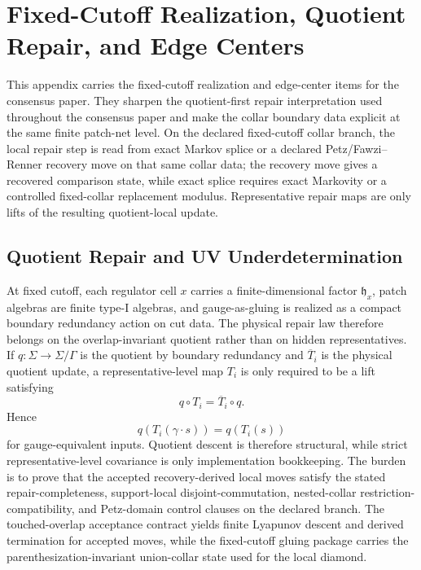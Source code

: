 \section{Fixed-Cutoff Realization, Quotient Repair, and Edge Centers}
\label{app:consensus-fixed-cutoff-port}

This appendix carries the fixed-cutoff realization and edge-center items for the consensus paper.
They sharpen the
quotient-first repair interpretation used throughout the consensus paper and make the collar
boundary data explicit at the same finite patch-net level. On the declared fixed-cutoff collar
branch, the local repair step is read from exact Markov splice or a declared Petz/Fawzi--Renner
recovery move on that same collar data; the recovery move gives a recovered comparison state, while
exact splice requires exact Markovity or a controlled fixed-collar replacement modulus. Representative
repair maps are only lifts of the resulting quotient-local update.

\subsection{Quotient Repair and UV Underdetermination}

At fixed cutoff, each regulator cell \(x\) carries a finite-dimensional factor
\(\mathfrak h_x\), patch algebras are finite type-I algebras, and gauge-as-gluing is realized as
a compact boundary redundancy action on cut data. The physical repair law therefore belongs on the
overlap-invariant quotient rather than on hidden representatives. If \(q:\Sigma\to\Sigma/\Gamma\)
is the quotient by boundary redundancy and \(\overline T_i\) is the physical quotient update, a
representative-level map \(T_i\) is only required to be a lift satisfying
\[
q\circ T_i=\overline T_i\circ q.
\]
Hence
\[
q(T_i(\gamma\cdot s))=q(T_i(s))
\]
for gauge-equivalent inputs. Quotient descent is therefore structural, while strict
representative-level covariance is only implementation bookkeeping. The burden is to prove that
the accepted recovery-derived local moves satisfy the stated repair-completeness, support-local
disjoint-commutation, nested-collar
restriction-compatibility, and Petz-domain control clauses on the declared branch. The
touched-overlap acceptance contract yields finite Lyapunov descent and derived
termination for accepted moves, while the fixed-cutoff gluing package carries the
parenthesization-invariant union-collar state used for the local diamond.

